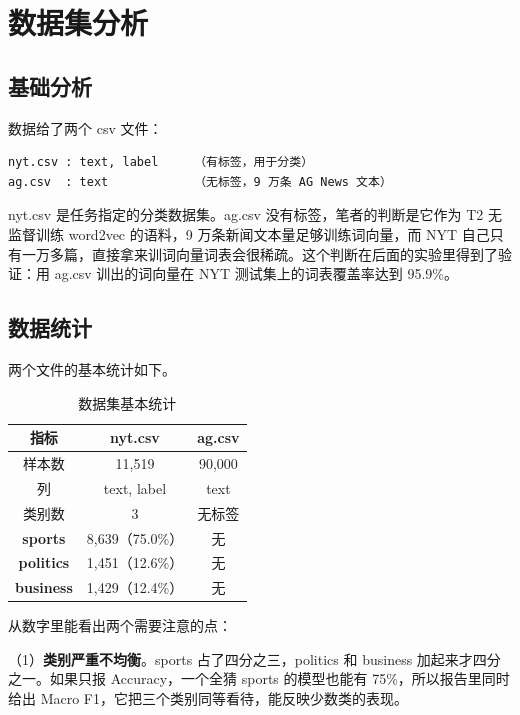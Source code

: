 \documentclass[UTF8,a4paper,10pt]{ctexart}
\begin{document}
\section{数据集分析}
\subsection{基础分析}

数据给了两个 csv 文件：

\begin{lstlisting}[frame=single,numbers=none]
nyt.csv : text, label     （有标签，用于分类）
ag.csv  : text            （无标签，9 万条 AG News 文本）
\end{lstlisting}

nyt.csv 是任务指定的分类数据集。ag.csv 没有标签，笔者的判断是它作为 T2 无监督训练 word2vec 的语料，9 万条新闻文本量足够训练词向量，而 NYT 自己只有一万多篇，直接拿来训词向量词表会很稀疏。这个判断在后面的实验里得到了验证：用 ag.csv 训出的词向量在 NYT 测试集上的词表覆盖率达到 95.9\%。

\subsection{数据统计}

两个文件的基本统计如下。

\begin{table}[h]
\centering
\caption{数据集基本统计}
\label{tab:data_stat}
\begin{tabular}{|c|c|c|}
\hline
\textbf{指标} & \textbf{nyt.csv} & \textbf{ag.csv} \\ \hline
样本数 & 11,519 & 90,000 \\ \hline
列 & text, label & text \\ \hline
类别数 & 3 & 无标签 \\ \hline
\textbf{sports} & 8,639（75.0\%） & 无 \\ \hline
\textbf{politics} & 1,451（12.6\%） & 无 \\ \hline
\textbf{business} & 1,429（12.4\%） & 无 \\ \hline
\end{tabular}
\end{table}

从数字里能看出两个需要注意的点：

（1）\textbf{类别严重不均衡}。sports 占了四分之三，politics 和 business 加起来才四分之一。如果只报 Accuracy，一个全猜 sports 的模型也能有 75\%，所以报告里同时给出 Macro F1，它把三个类别同等看待，能反映少数类的表现。
\end{document}
